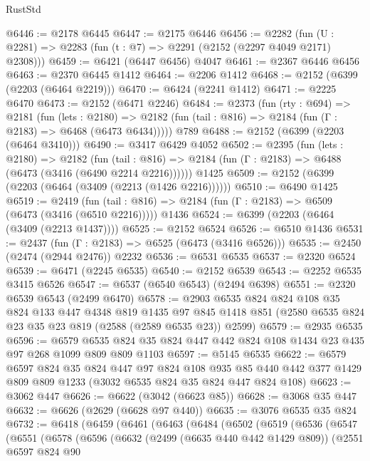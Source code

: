\begin{lexlean}{RustStd}
\begin{coremodule}
@6446 := @2178 @6445
@6447 := @2175 @6446
@6456 := @2282 (fun (U : @2281) => @2283 (fun (t : @7) => @2291 (@2152 (@2297 @4049 @2171) @2308)))
@6459 := @6421 (@6447 @6456) @4047
@6461 := @2367 @6446 @6456
@6463 := @2370 @6445 @1412
@6464 := @2206 @1412
@6468 := @2152 (@6399 (@2203 (@6464 @2219)))
@6470 := @6424 (@2241 @1412)
@6471 := @2225 @6470
@6473 := @2152 (@6471 @2246)
@6484 := @2373
    (fun (rty : @694) =>
    @2181
      (fun (lets : @2180) =>
      @2182 (fun (tail : @816) => @2184 (fun (Γ : @2183) => @6468 (@6473 @6434)))))
    @789
@6488 := @2152 (@6399 (@2203 (@6464 @3410)))
@6490 := @3417 @6429 @4052
@6502 := @2395
    (fun (lets : @2180) =>
    @2182
      (fun (tail : @816) => @2184 (fun (Γ : @2183) => @6488 (@6473 (@3416 (@6490 @2214 @2216))))))
    @1425
@6509 := @2152 (@6399 (@2203 (@6464 (@3409 (@2213 (@1426 @2216))))))
@6510 := @6490 @1425
@6519 := @2419
    (fun (tail : @816) => @2184 (fun (Γ : @2183) => @6509 (@6473 (@3416 (@6510 @2216)))))
    @1436
@6524 := @6399 (@2203 (@6464 (@3409 (@2213 @1437))))
@6525 := @2152 @6524
@6526 := @6510 @1436
@6531 := @2437 (fun (Γ : @2183) => @6525 (@6473 (@3416 @6526)))
@6535 := @2450 (@2474 (@2944 @2476)) @2232
@6536 := @6531 @6535
@6537 := @2320 @6524
@6539 := @6471 (@2245 @6535)
@6540 := @2152 @6539
@6543 := @2252 @6535 @3415 @6526
@6547 := @6537 (@6540 @6543) (@2494 @6398)
@6551 := @2320 @6539 @6543 (@2499 @6470)
@6578 := @2903
    @6535
    @824
    @824
    @108
    @35
    @824
    @133
    @447
    @4348
    @819
    @1435
    @97
    @845
    @1418
    @851
    (@2580 @6535 @824 @23 @35 @23 @819 (@2588 (@2589 @6535 @23)) @2599)
@6579 := @2935 @6535
@6596 := @6579 @6535 @824 @35 @824 @447 @442 @824 @108 @1434 @23 @435 @97 @268 @1099 @809 @809 @1103
@6597 := @5145 @6535
@6622 := @6579
    @6597
    @824
    @35
    @824
    @447
    @97
    @824
    @108
    @935
    @85
    @440
    @442
    @377
    @1429
    @809
    @809
    @1233
    (@3032 @6535 @824 @35 @824 @447 @824 @108)
@6623 := @3062 @447
@6626 := @6622 (@3042 (@6623 @85))
@6628 := @3068 @35 @447
@6632 := @6626 (@2629 (@6628 @97 @440))
@6635 := @3076 @6535 @35 @824
@6732 := @6418
    (@6459
      (@6461
        (@6463
          (@6484
            (@6502
              (@6519
                (@6536
                  (@6547
                    (@6551
                      (@6578
                        (@6596
                          (@6632
                            (@2499 (@6635 @440 @442 @1429 @809))
                            (@2551
                              @6597
                              @824
                              @90

\end{coremodule}
\end{lexlean}
